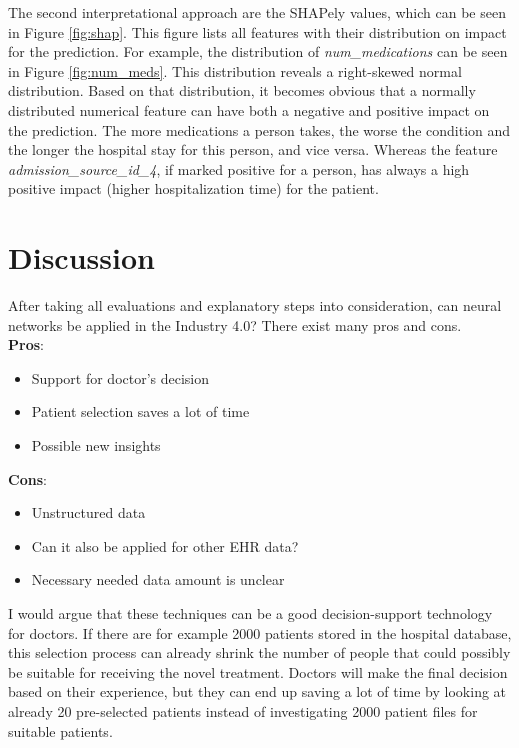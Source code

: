 \documentclass[journal]{IEEEtran}
\begin{document}
The second interpretational approach are the SHAPely values, which can be seen in Figure \ref{fig:shap}. This figure lists all features with their distribution on impact for the prediction. For example, the distribution of \textit{num\_medications} can be seen in Figure \ref{fig:num_meds}. This distribution reveals a right-skewed normal distribution. Based on that distribution, it becomes obvious that a normally distributed numerical feature can have both a negative and positive impact on the prediction. The more medications a person takes, the worse the condition and the longer the hospital stay for this person, and vice versa. Whereas the feature \textit{admission\_source\_id\_4}, if marked positive for a person, has always a high positive impact (higher hospitalization time) for the patient.  

%
%
\section{Discussion}
After taking all evaluations and explanatory steps into consideration, can neural networks be applied in the Industry 4.0? There exist many pros and cons. \\

\textbf{Pros}: 

\begin{itemize}
	\item Support for doctor's decision
	\item Patient selection saves a lot of time
	\item Possible new insights \\
\end{itemize}

\textbf{Cons}: 

\begin{itemize}
	\item Unstructured data
	\item Can it also be applied for other EHR data?
	\item Necessary needed data amount is unclear \\
\end{itemize}

I would argue that these techniques can be a good decision-support technology for doctors. If there are for example 2000 patients stored in the hospital database, this selection process can already shrink the number of people that could possibly be suitable for receiving the novel treatment. Doctors will make the final decision based on their experience, but they can end up saving a lot of time by looking at already 20 pre-selected patients instead of investigating 2000 patient files for suitable patients.
\end{document}
